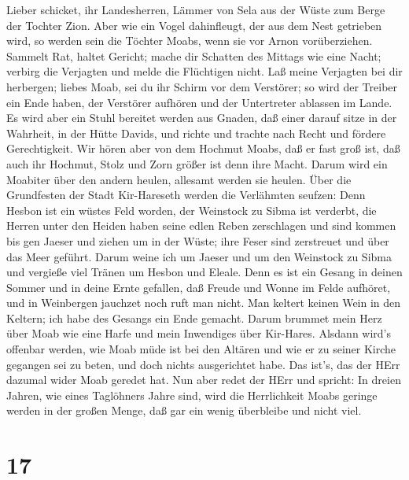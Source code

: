  Lieber schicket, ihr Landesherren, Lämmer von Sela aus der
Wüste zum Berge der Tochter Zion.  Aber wie ein Vogel
dahinfleugt, der aus dem Nest getrieben wird, so werden sein die Töchter
Moabs, wenn sie vor Arnon vorüberziehen.  Sammelt Rat,
haltet Gericht; mache dir Schatten des Mittags wie eine Nacht; verbirg
die Verjagten und melde die Flüchtigen nicht.  Laß meine
Verjagten bei dir herbergen; liebes Moab, sei du ihr Schirm vor dem
Verstörer; so wird der Treiber ein Ende haben, der Verstörer aufhören
und der Untertreter ablassen im Lande.  Es wird aber ein
Stuhl bereitet werden aus Gnaden, daß einer darauf sitze in der
Wahrheit, in der Hütte Davids, und richte und trachte nach Recht und
fördere Gerechtigkeit.  Wir hören aber von dem Hochmut
Moabs, daß er fast groß ist, daß auch ihr Hochmut, Stolz und Zorn größer
ist denn ihre Macht.  Darum wird ein Moabiter über den
andern heulen, allesamt werden sie heulen. Über die Grundfesten der
Stadt Kir-Hareseth werden die Verlähmten seufzen:  Denn
Hesbon ist ein wüstes Feld worden, der Weinstock zu Sibma ist verderbt,
die Herren unter den Heiden haben seine edlen Reben zerschlagen und sind
kommen bis gen Jaeser und ziehen um in der Wüste; ihre Feser sind
zerstreuet und über das Meer geführt.  Darum weine ich um
Jaeser und um den Weinstock zu Sibma und vergieße viel Tränen um Hesbon
und Eleale. Denn es ist ein Gesang in deinen Sommer und in deine Ernte
gefallen,  daß Freude und Wonne im Felde aufhöret, und in
Weinbergen jauchzet noch ruft man nicht. Man keltert keinen Wein in den
Keltern; ich habe des Gesangs ein Ende gemacht.  Darum
brummet mein Herz über Moab wie eine Harfe und mein Inwendiges über
Kir-Hares.  Alsdann wird's offenbar werden, wie Moab müde
ist bei den Altären und wie er zu seiner Kirche gegangen sei zu beten,
und doch nichts ausgerichtet habe.  Das ist's, das der HErr
dazumal wider Moab geredet hat.  Nun aber redet der HErr
und spricht: In dreien Jahren, wie eines Taglöhners Jahre sind, wird die
Herrlichkeit Moabs geringe werden in der großen Menge, daß gar ein wenig
überbleibe und nicht viel.

\hypertarget{section-16}{%
\section{17}\label{section-16}}

